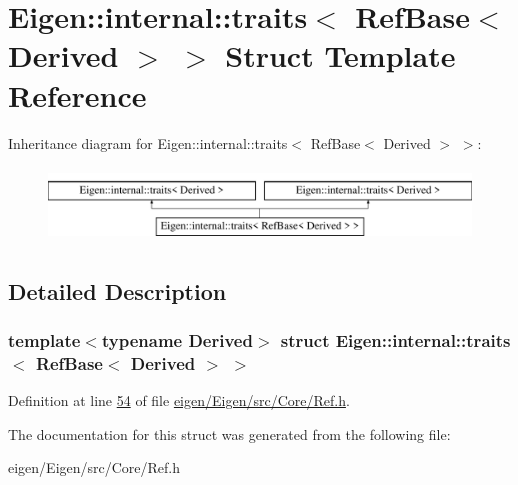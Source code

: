 \hypertarget{struct_eigen_1_1internal_1_1traits_3_01_ref_base_3_01_derived_01_4_01_4}{}\section{Eigen\+:\+:internal\+:\+:traits$<$ Ref\+Base$<$ Derived $>$ $>$ Struct Template Reference}
\label{struct_eigen_1_1internal_1_1traits_3_01_ref_base_3_01_derived_01_4_01_4}
Inheritance diagram for Eigen\+:\+:internal\+:\+:traits$<$ Ref\+Base$<$ Derived $>$ $>$\+:\begin{figure}[H]
\begin{center}
\leavevmode
\includegraphics[height=2.000000cm]{struct_eigen_1_1internal_1_1traits_3_01_ref_base_3_01_derived_01_4_01_4}
\end{center}
\end{figure}


\subsection{Detailed Description}
\subsubsection*{template$<$typename Derived$>$\newline
struct Eigen\+::internal\+::traits$<$ Ref\+Base$<$ Derived $>$ $>$}



Definition at line \hyperlink{eigen_2_eigen_2src_2_core_2_ref_8h_source_l00054}{54} of file \hyperlink{eigen_2_eigen_2src_2_core_2_ref_8h_source}{eigen/\+Eigen/src/\+Core/\+Ref.\+h}.



The documentation for this struct was generated from the following file\+:\begin{DoxyCompactItemize}
\item 
eigen/\+Eigen/src/\+Core/\+Ref.\+h\end{DoxyCompactItemize}
